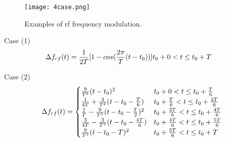 %
%
%
\begin{figure}[H]
   \centering   
   \texttt{[image: 4case.png]}
   \caption{Examples of rf frequency modulation.}
   \label{4case}
\end{figure}

Case (1) 
\begin{eqnarray}
\label{case_1}
\Delta f_{rf}(t)=
\frac{1}{2T}  [1-cos(\frac{2\pi}{T}(t-t_0))] &t_0+0<t\le t_0+T\cr  
\end{eqnarray}

Case (2) 
\begin{eqnarray}\Delta f_{rf}(t)= 
\begin{cases}
\frac{9}{T^3}(t-t_0)^2 &t_0+0<t\le t_0+\frac{T}{6}\cr  
\frac{1}{4T} +\frac{3}{T^2}(t-t_0 -\frac{T}{6}) &t_0+\frac{T}{6}<t\le t_0+\frac{2T}{6}\cr 
\frac{1}{T}-\frac{9}{T^3}(t-t_0-\frac{T}{2})^2 &t_0+\frac{2T}{6}<t\le t_0+\frac{4T}{6}\cr  
\frac{3}{4T} -\frac{3}{T^2}(t-t_0 -\frac{4T}{6})  &t_0+\frac{4T}{6}<t\le t_0+\frac{5T}{6}\cr  
\frac{9}{T^3}(t-t_0-T)^2 &t_0+\frac{5T}{6}<t\le t_0+T\cr  
\end{cases}
\end{eqnarray}

